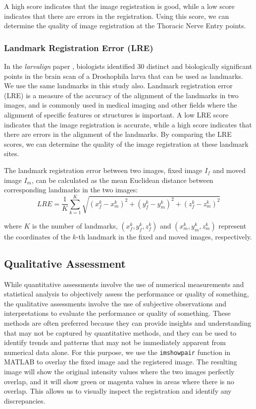\documentclass{book}
\begin{document}
	A high score indicates that the image registration is good, while a low score indicates that there are errors in the registration. Using this score, we can determine the quality of image registration at the Thoracic Nerve Entry points.
	
	\subsubsection{Landmark Registration Error (LRE)}
	In the \textit{larvalign} paper \cite{larvalign}, biologists identified 30 distinct and biologically significant points in the brain scan of a Droshophila larva that can be used as landmarks. We use the same landmarks in this study also. Landmark registration error (LRE) is a measure of the accuracy of the alignment of the landmarks in two images, and is commonly used in medical imaging and other fields where the alignment of specific features or structures is important. A low LRE score indicates that the image registration is accurate, while a high score indicates that there are errors in the alignment of the landmarks. By comparing the LRE scores, we can determine the quality of the image registration at these landmark sites.
	
	The landmark registration error between two images, fixed image $I_f$ and moved image $I_m$, can be calculated as the mean Euclidean distance between corresponding landmarks in the two images:
	\begin{equation}\label{eqn:lre}
		LRE = \frac{1}{K} \sum_{k=1}^K \sqrt{(x_f^k - x_m^k)^2 + (y_f^k - y_m^k)^2 + (z_f^k - z_m^k)^2}
	\end{equation}
	
	where $K$ is the number of landmarks, $(x_f^k, y_f^k, z_f^k)$ and $(x_m^k, y_m^k, z_m^k)$ represent the coordinates of the $k$-th landmark in the fixed and moved images, respectively.
	
	\subsection{Qualitative Assessment}
	While quantitative assessments involve the use of numerical measurements and statistical analysis to objectively assess the performance or quality of something, the qualitative assessments involve the use of subjective observations and interpretations to evaluate the performance or quality of something. These methods are often preferred because they can provide insights and understanding that may not be captured by quantitative methods, and they can be used to identify trends and patterns that may not be immediately apparent from numerical data alone.
	For this purpose, we use the \texttt{imshowpair} function in MATLAB to overlay the fixed image and the registered image. The resulting image will show the original intensity values where the two images perfectly overlap, and it will show green or magenta values in areas where there is no overlap. This allows us to visually inspect the registration and identify any discrepancies.
	
\end{document}
